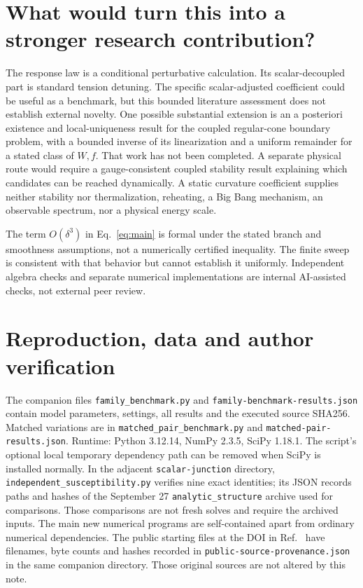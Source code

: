 \documentclass[11pt]{article}
\begin{document}
\section{What would turn this into a stronger research contribution?}
The response law is a conditional perturbative calculation. Its scalar-decoupled part is standard tension detuning. The specific scalar-adjusted coefficient could be useful as a benchmark, but this bounded literature assessment does not establish external novelty. One possible substantial extension is an a posteriori existence and local-uniqueness result for the coupled regular-cone boundary problem, with a bounded inverse of its linearization and a uniform remainder for a stated class of $W,f$. That work has not been completed. A separate physical route would require a gauge-consistent coupled stability result explaining which candidates can be reached dynamically. A static curvature coefficient supplies neither stability nor thermalization, reheating, a Big Bang mechanism, an observable spectrum, nor a physical energy scale.

The term $O(\delta^3)$ in Eq.~\eqref{eq:main} is formal under the stated branch and smoothness assumptions, not a numerically certified inequality. The finite sweep is consistent with that behavior but cannot establish it uniformly. Independent algebra checks and separate numerical implementations are internal AI-assisted checks, not external peer review.

\section{Reproduction, data and author verification}
The companion files \texttt{family\_benchmark.py} and \texttt{family-benchmark-results.json} contain model parameters, settings, all results and the executed source SHA256. Matched variations are in \texttt{matched\_pair\_benchmark.py} and \texttt{matched-pair-results.json}. Runtime: Python 3.12.14, NumPy 2.3.5, SciPy 1.18.1. The script's optional local temporary dependency path can be removed when SciPy is installed normally. In the adjacent \texttt{scalar-junction} directory, \texttt{independent\_susceptibility.py} verifies nine exact identities; its JSON records paths and hashes of the September 27 \texttt{analytic\_structure} archive used for comparisons. Those comparisons are not fresh solves and require the archived inputs. The main new numerical programs are self-contained apart from ordinary numerical dependencies. The public starting files at the DOI in Ref.~\cite{maldonado} have filenames, byte counts and hashes recorded in \texttt{public-source-provenance.json} in the same companion directory. Those original sources are not altered by this note.
\end{document}
